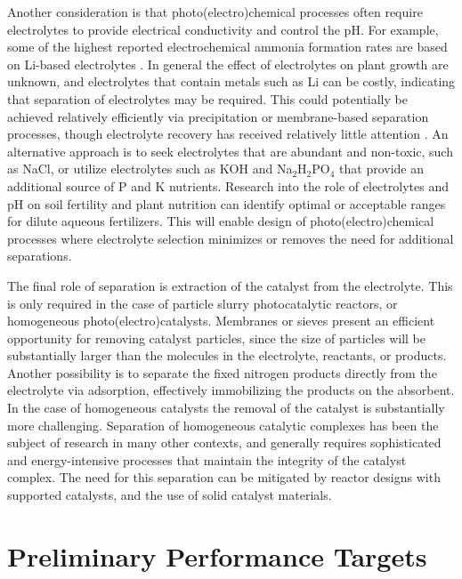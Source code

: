 Another consideration is that photo(electro)chemical processes often require electrolytes to provide electrical conductivity and control the pH. For example, some of the highest reported electrochemical ammonia formation rates are based on Li-based electrolytes \cite{Song_2018}. In general the effect of electrolytes on plant growth are unknown, and electrolytes that contain metals such as Li can be costly, indicating that separation of electrolytes may be required. This could potentially be achieved relatively efficiently via precipitation or membrane-based separation processes, though electrolyte recovery has received relatively little attention \needcite. An alternative approach is to seek electrolytes that are abundant and non-toxic, such as NaCl, or utilize electrolytes such as KOH and Na$_2$H$_2$PO$_4$ that provide an additional source of P and K nutrients. Research into the role of electrolytes and pH on soil fertility and plant nutrition can identify optimal or acceptable ranges for dilute aqueous fertilizers. This will enable design of photo(electro)chemical processes where electrolyte selection minimizes or removes the need for additional separations.

The final role of separation is extraction of the catalyst from the electrolyte. This is only required in the case of particle slurry photocatalytic reactors, or homogeneous photo(electro)catalysts. Membranes or sieves present an efficient opportunity for removing catalyst particles, since the size of particles will be substantially larger than the molecules in the electrolyte, reactants, or products. Another possibility is to separate the fixed nitrogen products directly from the electrolyte via adsorption, effectively immobilizing the products on the absorbent. In the case of homogeneous catalysts the removal of the catalyst is substantially more challenging. Separation of homogeneous catalytic complexes has been the subject of research in many other contexts, and generally requires sophisticated and energy-intensive processes that maintain the integrity of the catalyst complex. The need for this separation can be mitigated by reactor designs with supported catalysts, and the use of solid catalyst materials.


\section{Preliminary Performance Targets}
\label{sec:targets}

